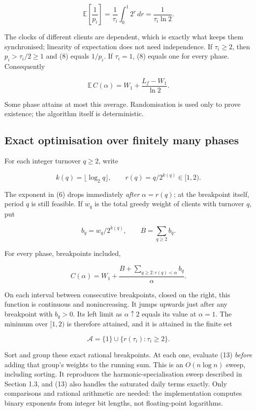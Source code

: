 \documentclass[
  british,
  11pt,
  a4paper,
]{article}
\begin{document}
\[
\mathbb E\left[\frac1{p_i}\right]
=\frac1{\tau_i}\int_0^1 2^r\,dr
=\frac1{\tau_i\ln2}. \tag{11}
\]

The clocks of different clients are dependent, which is exactly what
keeps them synchronised; linearity of expectation does not need
independence. If \(\tau_i\ge2\), then \(p_i>\tau_i/2\ge1\) and (8)
equals \(1/p_i\). If \(\tau_i=1\), (8) equals one for every phase.
Consequently

\[
\mathbb E\, C(\alpha)=W_1+\frac{L_f-W_1}{\ln2}. \tag{12}
\]

Some phase attains at most this average. Randomisation is used only to
prove existence; the algorithm itself is deterministic.

\subsection{Exact optimisation over finitely many
phases}\label{exact-optimisation-over-finitely-many-phases}

For each integer turnover \(q\ge2\), write

\[
k(q)=\lfloor\log_2q\rfloor,\qquad
r(q)=q/2^{k(q)}\in[1,2).
\]

The exponent in (6) drops immediately \emph{after} \(\alpha=r(q)\); at
the breakpoint itself, period \(q\) is still feasible. If \(w_q\) is the
total greedy weight of clients with turnover \(q\), put

\[
b_q=w_q/2^{k(q)},\qquad B=\sum_{q\ge2}b_q.
\]

For every phase, breakpoints included,

\[
C(\alpha)=W_1+
\frac{B+\sum_{q\ge2:r(q)<\alpha}b_q}{\alpha}. \tag{13}
\]

On each interval between consecutive breakpoints, closed on the right,
this function is continuous and nonincreasing. It jumps upwards just
after any breakpoint with \(b_q>0\). Its left limit as
\(\alpha\uparrow2\) equals its value at \(\alpha=1\). The minimum over
\([1,2)\) is therefore attained, and it is attained in the finite set

\[
\mathcal A=\{1\}\cup\{r(\tau_i):\tau_i\ge2\}. \tag{14}
\]

Sort and group these exact rational breakpoints. At each one, evaluate
(13) \emph{before} adding that group's weights to the running sum. This
is an \(O(n\log n)\) sweep, including sorting. It reproduces the
harmonic-specialisation sweep described in Section 1.3, and (13) also
handles the saturated daily terms exactly. Only comparisons and rational
arithmetic are needed: the implementation computes binary exponents from
integer bit lengths, not floating-point logarithms.
\end{document}
